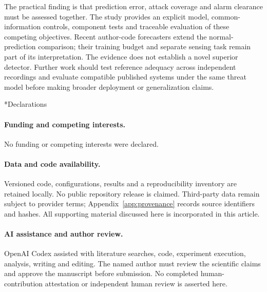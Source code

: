 \documentclass[11pt,twocolumn]{article}
\makeatletter
\renewcommand\section{\@startsection{section}{1}{\z@}{-2.5ex plus -1ex minus -.2ex}{1.2ex plus .2ex}{\normalfont\large\bfseries\raggedright}}
\makeatother
\begin{document}
The practical finding is that prediction error, attack coverage and alarm clearance must be assessed together. The study provides an explicit model, common-information controls, component tests and traceable evaluation of these competing objectives. Recent author-code forecasters extend the normal-prediction comparison; their training budget and separate sensing task remain part of its interpretation. The evidence does not establish a novel superior detector. Further work should test reference adequacy across independent recordings and evaluate compatible published systems under the same threat model before making broader deployment or generalization claims.


\section*{Declarations}
\paragraph{Funding and competing interests.} No funding or competing interests were declared.
\paragraph{Data and code availability.} Versioned code, configurations, results and a reproducibility inventory are retained locally. No public repository release is claimed. Third-party data remain subject to provider terms; Appendix~\ref{app:provenance} records source identifiers and hashes. All supporting material discussed here is incorporated in this article.
\paragraph{AI assistance and author review.} OpenAI Codex assisted with literature searches, code, experiment execution, analysis, writing and editing. The named author must review the scientific claims and approve the manuscript before submission. No completed human-contribution attestation or independent human review is asserted here.
\appendix



\begingroup\raggedright\fontsize{9.6}{10}\selectfont

\endgroup
\end{document}
